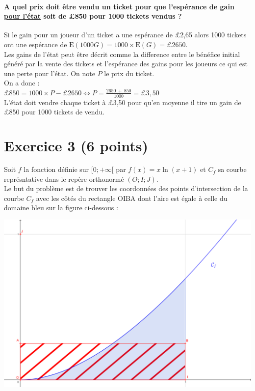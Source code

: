\documentclass[a4paper, 12pt]{article}
\begin{document}
\paragraph*{A quel prix doit être vendu un ticket pour que l'espérance de gain \underline{pour l'état} soit de £850 pour 1000 tickets vendus ?\\[5mm]}

Si le gain pour un joueur d'un ticket a une espérance de £2,65 alors 1000 tickets ont une espérance de $\text{E}(1000G) = 1000\times \text{E}(G) = \pounds 2650$. 
\\
Les gains de l'état peut être décrit comme la difference entre le bénéfice initial généré par la vente des tickets et l'espérance des gains pour les joueurs ce qui est une perte pour l'état.
On note $P$ le prix du ticket. \\
On a donc : \\[2mm]
$\pounds 850 = 1000 \times P - \pounds 2650 \iff P = \frac{2650\ +\ 850}{1000} = \pounds 3,50$ \\[2mm]
L'état doit vendre chaque ticket à £3,50 pour qu'en moyenne il tire un gain de £850 pour 1000 tickets de vendu.
\vspace{1cm}

{}
\section*{Exercice 3 (6 points)}

Soit $f$ la fonction définie sur $[0;+\infty[$ par $f(x) = x\ln \left(x + 1 \right)$ et $C_f$ sa courbe représntative dans le repère orthonormé $(O;I;J)$.
\\
Le but du problème est de trouver les coordonnées des points d'intersection de la courbe $C_f$ avec les côtés du rectangle OIBA dont l'aire est égale à celle du domaine bleu sur la figure ci-dessous :
\\
\begin{center}
\includegraphics[width=400pt]{ControleCommunMathsGrapheExercice3}
\end{center}
\end{document}

